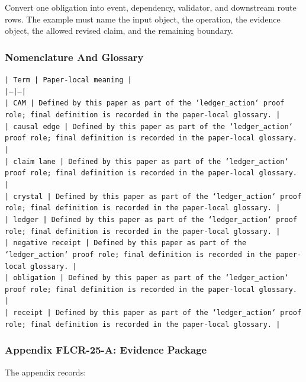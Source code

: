 \documentclass[11pt]{article}
\begin{document}
Convert one obligation into event, dependency, validator, and downstream route rows. The example must name the input object, the operation,
the evidence object, the allowed revised claim, and the remaining boundary.

\subsubsection*{Nomenclature And Glossary}

\noindent\texttt{| Term | Paper-local meaning |}\\
\noindent\texttt{|---|---|}\\
\noindent\texttt{| CAM | Defined by this paper as part of the `ledger\_action` proof role; final definition is recorded in the paper-local glossary. |}\\
\noindent\texttt{| causal edge | Defined by this paper as part of the `ledger\_action` proof role; final definition is recorded in the paper-local glossary. |}\\
\noindent\texttt{| claim lane | Defined by this paper as part of the `ledger\_action` proof role; final definition is recorded in the paper-local glossary. |}\\
\noindent\texttt{| crystal | Defined by this paper as part of the `ledger\_action` proof role; final definition is recorded in the paper-local glossary. |}\\
\noindent\texttt{| ledger | Defined by this paper as part of the `ledger\_action` proof role; final definition is recorded in the paper-local glossary. |}\\
\noindent\texttt{| negative receipt | Defined by this paper as part of the `ledger\_action` proof role; final definition is recorded in the paper-local glossary. |}\\
\noindent\texttt{| obligation | Defined by this paper as part of the `ledger\_action` proof role; final definition is recorded in the paper-local glossary. |}\\
\noindent\texttt{| receipt | Defined by this paper as part of the `ledger\_action` proof role; final definition is recorded in the paper-local glossary. |}\\

\subsubsection*{Appendix FLCR-25-A: Evidence Package}

The appendix records:
\end{document}
